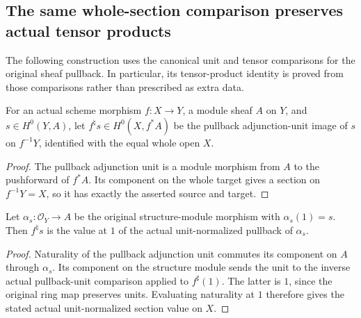 \subsection{The same whole-section comparison preserves actual tensor products}
The following construction uses the canonical unit and tensor comparisons
for the original sheaf pullback. In particular, its tensor-product identity
is proved from those comparisons rather than prescribed as extra data.

\begin{definition}
\label{def:intrinsic-resume-whole-section-pullback}
\leanok
For an actual scheme morphism $f:X\to Y$, a module sheaf $A$ on $Y$, and
$s\in H^0(Y,A)$, let $f^\natural s\in H^0(X,f^*A)$ be the pullback
adjunction-unit image of $s$ on $f^{-1}Y$, identified with the equal whole
open $X$.
\end{definition}
\begin{proof}
The pullback adjunction unit is a module morphism from $A$ to the
pushforward of $f^*A$. Its component on the whole target gives a section
on $f^{-1}Y=X$, so it has exactly the asserted source and target.
\end{proof}

\begin{lemma}
\label{lem:intrinsic-resume-whole-section-unit-value}
\leanok
{}
Let $\alpha_s:\mathcal O_Y\to A$ be the original structure-module
morphism with $\alpha_s(1)=s$. Then $f^\natural s$ is the value at $1$
of the actual unit-normalized pullback of $\alpha_s$.
\end{lemma}
\begin{proof}
Naturality of the pullback adjunction unit commutes its component on
$A$ through $\alpha_s$. Its component on the structure module sends the
unit to the inverse actual pullback-unit comparison applied to
$f^\sharp(1)$. The latter is $1$, since the original ring map preserves
units. Evaluating naturality at $1$ therefore gives the stated actual
unit-normalized section value on $X$.
\end{proof}

